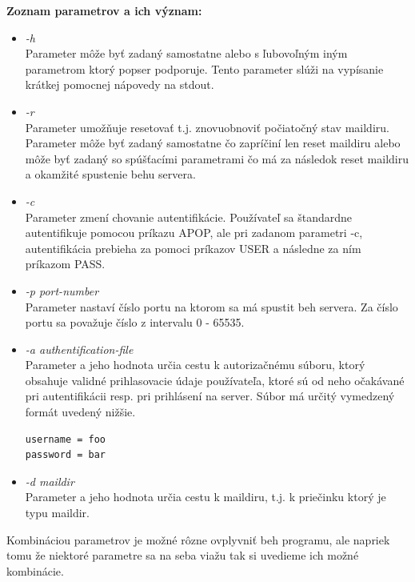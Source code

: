 \documentclass[11pt,a4paper]{article}
\begin{document}
	\textbf{Zoznam parametrov a ich význam:}
	\begin{itemize}

		\item \textit{-h}\\[0.4em]
			Parameter môže byť zadaný samostatne alebo s ľubovoľným iným parametrom ktorý popser podporuje. Tento parameter slúži na vypísanie krátkej pomocnej nápovedy na stdout.

		\item \textit{-r}\\[0.4em]
			Parameter umožňuje resetovať t.j. znovuobnoviť počiatočný stav maildiru. Parameter môže byť zadaný samostatne čo zapríčiní len reset maildiru alebo môže byť zadaný so spúšťacími parametrami čo má za následok reset maildiru a okamžité spustenie behu servera.

		\item \textit{-c}\\[0.4em]
			Parameter zmení chovanie autentifikácie. Používateľ sa štandardne autentifikuje pomocou príkazu APOP, ale pri zadanom parametri -c, autentifikácia prebieha za pomoci príkazov USER a následne za ním príkazom PASS.

		\item \textit{-p port-number}\\[0.4em]
			Parameter nastaví číslo portu na ktorom sa má spustit beh servera. Za číslo portu sa považuje číslo z intervalu 0 - 65535.

		\item \textit{-a authentification-file}\\[0.4em]
			Parameter a jeho hodnota určia cestu k autorizačnému súboru, ktorý obsahuje validné prihlasovacie údaje používateľa, ktoré sú od neho očakávané pri autentifikácii resp. pri prihlásení na server. Súbor má určitý vymedzený formát uvedený nižšie.
\begin{lstlisting}[xleftmargin=.35\textwidth]
username = foo
password = bar
\end{lstlisting}

		\item \textit{-d maildir}\\[0.4em]
			Parameter a jeho hodnota určia cestu k maildiru, t.j. k priečinku ktorý je typu maildir\cite{MAILDIR}.\\

	\end{itemize}

	Kombináciou parametrov je možné rôzne ovplyvniť beh programu, ale napriek tomu že niektoré parametre sa na seba viažu tak si uvedieme ich možné kombinácie.\\
\end{document}
